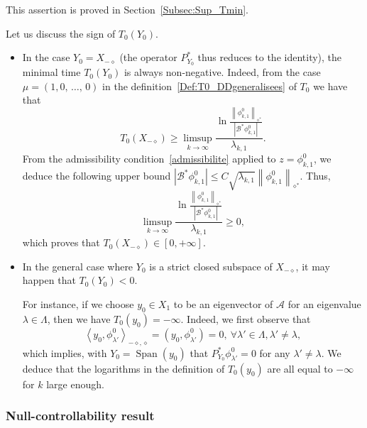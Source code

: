 \documentclass[AHL,Unicode,longabstracts]{cedram}
\newcommand\A{\mathcal{A}}
\newcommand\Bs{\mathcal{B}^*}
\newcommand{\Xun}{X_1}
\newcommand{\Xmalpha}{X_{-\diamond}}
\newcommand{\Fzp}{Y_0}
\newcommand{\normeXalphas}[1]{\left\| #1 \right\|_{\diamond^*}}
\newcommand{\psX}[2]{\left(#1, #2 \right)}
\newcommand{\dual}[2]{\left\langle #1, #2 \right\rangle_{-\diamond,\diamond}}
\newcommand{\PFa}{P_{\Fzp}^*}
\DeclareMathOperator{\Span}{Span}
\let\oldforall\forall
\renewcommand*{\forall}{\mathrel{\oldforall}}
\begin{document}
This assertion is proved in Section~\ref{Subsec:Sup_Tmin}.


\begin{rema} \label{Rmq:T0positif}
Let us discuss the sign of $T_0(\Fzp)$.
\begin{itemize}
\item In the case $\Fzp=\Xmalpha$ (the operator $\PFa$ thus reduces to the identity), the minimal time $T_0(\Fzp)$ is always non-negative. Indeed, from the case $\mu = (1, 0,\,\dotsc,\,0)$ in the definition~\eqref{Def:T0_DDgeneralisees} of $T_0$ we have that
\[
T_0(\Xmalpha) \geq \limsup_{k\to \infty} \frac{\ln \frac{ \normeXalphas{\phi_{k,1}^0 } }{ \left| \Bs \phi_{k,1}^0 \right|}}{\lambda_{k,1}}.
\]
From the admissibility condition~\eqref{admissibilite} applied to $z=\phi_{k,1}^0$, we deduce the following upper bound $\left| \Bs \phi_{k,1}^0 \right| \leq C \sqrt{\lambda_{k,1}}\normeXalphas{\phi_{k,1}^0 }$. Thus,
\[
\limsup_{k\to \infty} \frac{\ln \frac{ \normeXalphas{\phi_{k,1}^0 } }{ \left| \Bs \phi_{k,1}^0 \right|}}{\lambda_{k,1}} \geq 0,
\]
which proves that $T_0(\Xmalpha) \in [0,+\infty]$.
\item In the general case where $\Fzp$ is a strict closed subspace of $\Xmalpha$, it may happen that $T_0(\Fzp)<0$.

For instance, if we choose $y_0\in \Xun$ to be an eigenvector of $\A$ for an eigenvalue $\lambda\in \Lambda$, then we have $T_0(y_0)=-\infty$. Indeed, we first observe that
\[
\dual{y_0}{\phi_{\lambda'}^0} = \psX{y_0}{\phi_{\lambda'}^0} = 0, \ \forall \lambda'\in \Lambda, \lambda'\neq \lambda,
\]
which implies, with $\Fzp=\Span(y_0)$ that $\PFa \phi_{\lambda'}^0=0$ for any $\lambda'\neq \lambda$. We deduce that the logarithms in the definition of $T_0(y_0)$ are all equal to $-\infty$ for $k$ large enough.
\end{itemize}
\end{rema}



\subsubsection{Null-controllability result}\label{Sect:mainresult}
\end{document}
